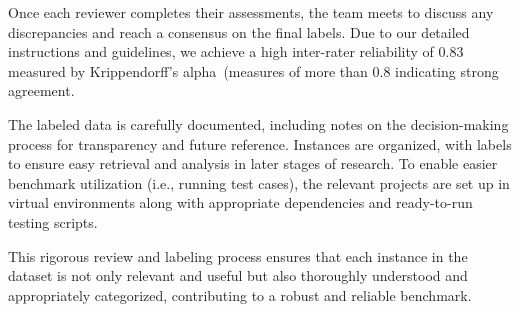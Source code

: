 Once each reviewer completes their assessments, the team meets to discuss any discrepancies and reach a consensus on the final labels. Due to our detailed instructions and guidelines, we achieve a high inter-rater reliability of 0.83 measured by Krippendorff's alpha~\cite{zapf2016measuring}(measures of more than 0.8 indicating strong agreement.

The labeled data is carefully documented, including notes on the decision-making process for transparency and future reference. Instances are organized, with labels to ensure easy retrieval and analysis in later stages of research. To enable easier benchmark utilization (i.e., running test cases), the relevant projects are set up in virtual environments along with appropriate dependencies and ready-to-run testing scripts.

This rigorous review and labeling process ensures that each instance in the dataset is not only relevant and useful but also thoroughly understood and appropriately categorized, contributing to a robust and reliable benchmark. %






